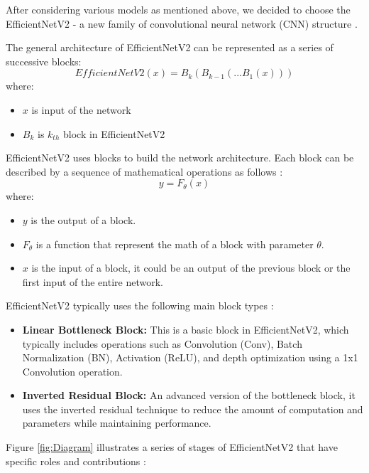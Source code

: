 \documentclass[conference]{IEEEtran}
\begin{document}
After considering various models as mentioned above, we decided to choose the EfficientNetV2 - a new family of convolutional neural network (CNN) structure \cite{tan2019efficientnet,tan2021efficientnetv2,lee2023identification}.

The general architecture of EfficientNetV2 can be represented as a series of successive blocks:
\begin{equation}
    EfficientNetV2(x) = B_k(B_{k-1}(...B_1(x)))
\end{equation}
where:
\begin{itemize}
    \item $x$ is input of the network
    \item $B_k$ is $k_{th}$ block in EfficientNetV2 
\end{itemize}
EfficientNetV2 uses blocks to build the network architecture. Each block can be described by a sequence of mathematical operations as follows \cite{tan2021efficientnetv2}:
\begin{equation}
    y = F_{\theta}(x)
\end{equation}
where:
\begin{itemize}
    \item $y$ is the output of a block.
    \item $F_\theta$ is a function that represent the math of a block with parameter $\theta$.
    \item $x$ is the input of a block, it could be an output of the previous block or the first input of the entire network.
\end{itemize}
EfficientNetV2 typically uses the following main block types \cite{lee2023identification}: 
\begin{itemize}
    \item \textbf{Linear Bottleneck Block:} This is a basic block in EfficientNetV2, which typically includes operations such as Convolution (Conv), Batch Normalization (BN), Activation (ReLU), and depth optimization using a 1x1 Convolution operation.
    \item \textbf{Inverted Residual Block:} An advanced version of the bottleneck block, it uses the inverted residual technique to reduce the amount of computation and parameters while maintaining performance.
\end{itemize} 
Figure \ref{fig:Diagram} illustrates a series of stages of EfficientNetV2 that have specific roles and contributions \cite{lee2023identification}:
\end{document}
